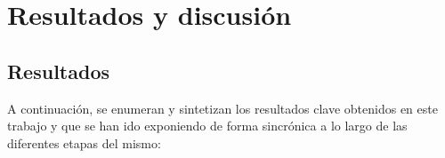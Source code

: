 \chapter{Resultados y discusión}


\section{Resultados}

A continuación, se enumeran y sintetizan los resultados clave obtenidos en este trabajo y que se han ido exponiendo de forma sincrónica a lo largo de las diferentes etapas del mismo:


